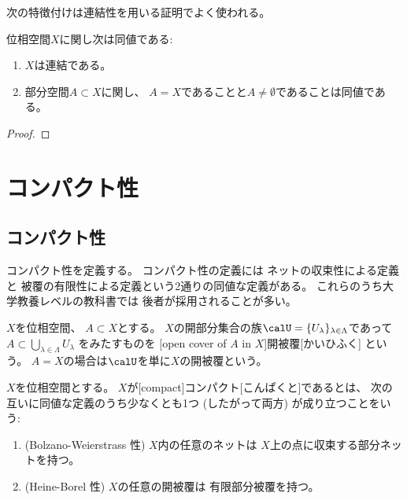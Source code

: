 \documentclass[report]{jlreq}
\begin{document}
\begin{definition}[局所連結]
    \TODO{}
\end{definition}

次の特徴付けは連結性を用いる証明でよく使われる。

\begin{proposition}[連結性の特徴付け]
    位相空間$X$に関し次は同値である:
    \begin{enumerate}
        \item $X$は連結である。
        \item 部分空間$A \subset X$に関し、
            $A = X$であることと$A \neq \emptyset$であることは同値である。
    \end{enumerate}
\end{proposition}

\begin{proof}
    \TODO{}
\end{proof}


%
\chapter{コンパクト性}

%
\section{コンパクト性}

コンパクト性を定義する。
コンパクト性の定義には
ネットの収束性による定義と
被覆の有限性による定義という2通りの同値な定義がある。
これらのうち大学教養レベルの教科書では
後者が採用されることが多い。

\begin{definition}[開被覆]
    $X$を位相空間、
    $A \subset X$とする。
    $X$の開部分集合の族$\calU = \{ U_\lambda \}_{\lambda \in \Lambda}$であって
    $A \subset \bigcup_{\lambda \in \Lambda} U_\lambda$
    をみたすものを
    [open cover of $A$ in $X$]{開被覆}[かいひふく]
    という。
    $A = X$の場合は$\calU$を単に$X$の開被覆という。
\end{definition}

\begin{definition}[コンパクト]
    $X$を位相空間とする。
    $X$が[compact]{コンパクト}[こんぱくと]であるとは、
    次の互いに同値な定義のうち少なくとも1つ (したがって両方)
    が成り立つことをいう:
    \begin{enumerate}
        \item (Bolzano-Weierstrass 性)
            $X$内の任意のネットは
            $X$上の点に収束する部分ネットを持つ。
        \item (Heine-Borel 性)
            $X$の任意の開被覆は
            有限部分被覆を持つ。
    \end{enumerate}
\end{definition}
\end{document}
